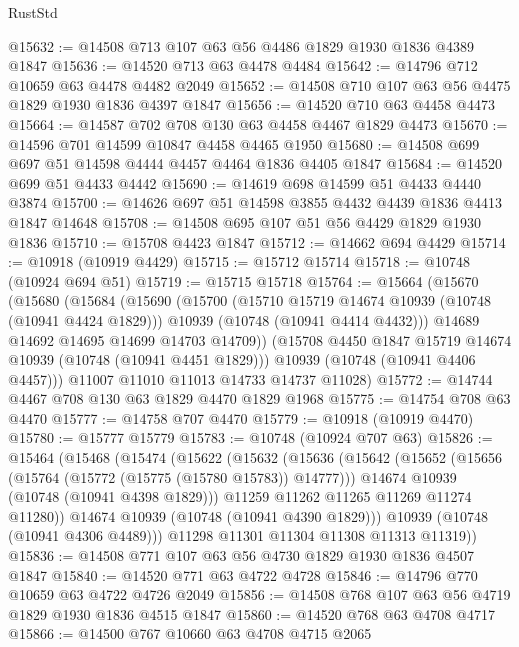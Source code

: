 \begin{lexlean}{RustStd}
\begin{coremodule}
{\begin{coremodule}
{{{{{@15632 := @14508 @713 @107 @63 @56 @4486 @1829 @1930 @1836 @4389 @1847
@15636 := @14520 @713 @63 @4478 @4484
@15642 := @14796 @712 @10659 @63 @4478 @4482 @2049
@15652 := @14508 @710 @107 @63 @56 @4475 @1829 @1930 @1836 @4397 @1847
@15656 := @14520 @710 @63 @4458 @4473
@15664 := @14587 @702 @708 @130 @63 @4458 @4467 @1829 @4473
@15670 := @14596 @701 @14599 @10847 @4458 @4465 @1950
@15680 := @14508 @699 @697 @51 @14598 @4444 @4457 @4464 @1836 @4405 @1847
@15684 := @14520 @699 @51 @4433 @4442
@15690 := @14619 @698 @14599 @51 @4433 @4440 @3874
@15700 := @14626 @697 @51 @14598 @3855 @4432 @4439 @1836 @4413 @1847 @14648
@15708 := @14508 @695 @107 @51 @56 @4429 @1829 @1930 @1836
@15710 := @15708 @4423 @1847
@15712 := @14662 @694 @4429
@15714 := @10918 (@10919 @4429)
@15715 := @15712 @15714
@15718 := @10748 (@10924 @694 @51)
@15719 := @15715 @15718
@15764 := @15664
    (@15670
      (@15680
        (@15684
          (@15690
            (@15700
              (@15710 @15719 @14674 @10939 (@10748 (@10941 @4424 @1829)))
              @10939
              (@10748 (@10941 @4414 @4432)))
            @14689
            @14692
            @14695
            @14699
            @14703
            @14709))
        (@15708 @4450 @1847 @15719 @14674 @10939 (@10748 (@10941 @4451 @1829)))
        @10939
        (@10748 (@10941 @4406 @4457)))
      @11007
      @11010
      @11013
      @14733
      @14737
      @11028)
@15772 := @14744 @4467 @708 @130 @63 @1829 @4470 @1829 @1968
@15775 := @14754 @708 @63 @4470
@15777 := @14758 @707 @4470
@15779 := @10918 (@10919 @4470)
@15780 := @15777 @15779
@15783 := @10748 (@10924 @707 @63)
@15826 := @15464
    (@15468
      (@15474
        (@15622
          (@15632
            (@15636
              (@15642
                (@15652
                  (@15656 (@15764 (@15772 (@15775 (@15780 @15783)) @14777)))
                  @14674
                  @10939
                  (@10748 (@10941 @4398 @1829)))
                @11259
                @11262
                @11265
                @11269
                @11274
                @11280))
            @14674
            @10939
            (@10748 (@10941 @4390 @1829)))
          @10939
          (@10748 (@10941 @4306 @4489)))
        @11298
        @11301
        @11304
        @11308
        @11313
        @11319))
@15836 := @14508 @771 @107 @63 @56 @4730 @1829 @1930 @1836 @4507 @1847
@15840 := @14520 @771 @63 @4722 @4728
@15846 := @14796 @770 @10659 @63 @4722 @4726 @2049
@15856 := @14508 @768 @107 @63 @56 @4719 @1829 @1930 @1836 @4515 @1847
@15860 := @14520 @768 @63 @4708 @4717
@15866 := @14500 @767 @10660 @63 @4708 @4715 @2065
}}}}}
\end{coremodule}}
\end{coremodule}
\end{lexlean}
